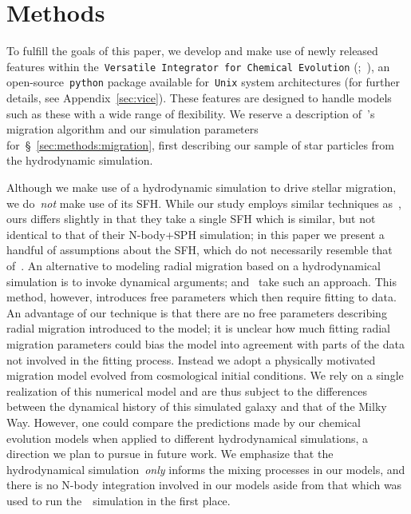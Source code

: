 \documentclass[draft2.tex]{subfiles}
\begin{document}
 

\section{Methods} 
\label{sec:methods} 
To fulfill the goals of this paper, we develop and make use of newly released 
features within the~\texttt{Versatile Integrator for Chemical Evolution} 
(\vice;~\citealp{Johnson2020}), an open-source~\texttt{python} package 
available for~\texttt{Unix} system architectures (for further details, see 
Appendix~\ref{sec:vice}). 
These features are designed to handle models such as these with a wide range of 
flexibility. 
We reserve a description of~\vice's migration algorithm and our simulation 
parameters for~\S~\ref{sec:methods:migration}, first describing our sample of 
star particles from the hydrodynamic simulation. 
\par 
Although we make use of a hydrodynamic simulation to drive stellar migration, 
we do~\textit{not} make use of its SFH. 
While our study employs similar techniques as~\citet{Minchev2013}, ours differs 
slightly in that they take a single SFH which is similar, but not identical to 
that of their N-body+SPH simulation; in this paper we present a handful of 
assumptions about the SFH, which do not necessarily resemble that of~\hsim. 
An alternative to modeling radial migration based on a 
hydrodynamical simulation is to invoke dynamical arguments; 
\citet{Schoenrich2009a} and~\citet{Sharma2020} take such an approach. 
This method, however, introduces free parameters which then require fitting to 
data. 
An advantage of our technique is that there are no free parameters describing 
radial migration introduced to the model; it is unclear how much 
fitting radial migration parameters could bias the model into agreement with 
parts of the data not involved in the fitting process. 
Instead we adopt a physically motivated migration model evolved from 
cosmological initial conditions. 
We rely on a single realization of this numerical model and are thus subject to 
the differences between the dynamical history of this simulated galaxy and that 
of the Milky Way. 
However, one could compare the predictions made by our chemical evolution 
models when applied to different hydrodynamical simulations, a direction we 
plan to pursue in future work. 
We emphasize that the hydrodynamical simulation~\textit{only} informs the 
mixing processes in our models, and there is no N-body integration involved in 
our models aside from that which was used to run the~\hsim~simulation in the 
first place. 
\end{document}
